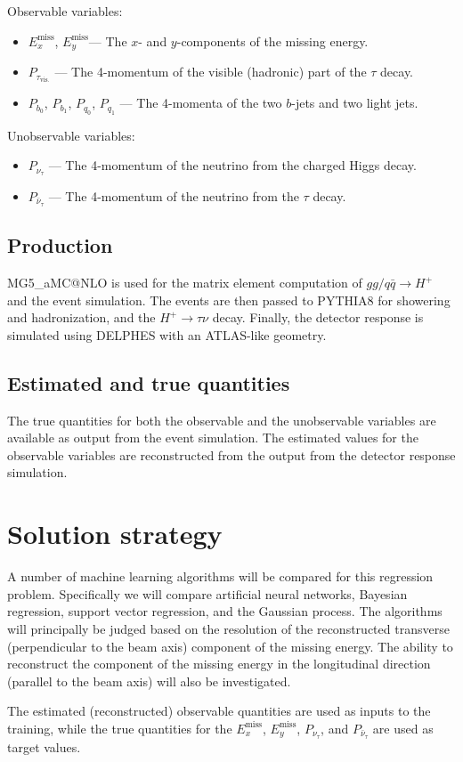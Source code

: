 \documentclass{scrartcl}
\newcommand{\exmiss}{$E_x^\text{miss}$}
\newcommand{\eymiss}{$E_y^\text{miss}$}
\begin{document}
Observable variables:
\begin{itemize}
    \item \exmiss, \eymiss --- The $x$- and $y$-components of the missing energy.
    \item $P_{\tau_\mathrm{vis.}}$ --- The 4-momentum of the visible (hadronic) part of the $\tau$ decay.
    \item $P_{b_0}$, $P_{b_1}$, $P_{q_0}$, $P_{q_1}$ --- The 4-momenta of the two $b$-jets and two light jets.
\end{itemize}

Unobservable variables:
\begin{itemize}
    \item $P_{\nu_\tau}$ --- The 4-momentum of the neutrino from the charged Higgs decay.
    \item $P_{\bar\nu_\tau}$ --- The 4-momentum of the neutrino from the $\tau$ decay.
\end{itemize}

\subsection{Production}
MG5\_aMC@NLO \cite{Alwall:2014hca} is used for the matrix element computation of $gg / q \bar q \to H^+$ and the event simulation. The events are then passed to PYTHIA8 \cite{Sjöstrand2015159} for showering and hadronization, and the $H^+\to \tau\nu$ decay. Finally, the detector response is simulated using DELPHES \cite{Favereau2014} with an ATLAS-like geometry.

\subsection{Estimated and true quantities}
The true quantities for both the observable and the unobservable variables are available as output from the event simulation. The estimated values for the observable variables are reconstructed from the output from the detector response simulation.

\section{Solution strategy}
A number of machine learning algorithms will be compared for this regression problem. Specifically we will compare artificial neural networks, Bayesian regression, support vector regression, and the Gaussian process. The algorithms will principally be judged based on the resolution of the reconstructed transverse (perpendicular to the beam axis) component of the missing energy. The ability to reconstruct the component of the missing energy in the longitudinal direction (parallel to the beam axis) will also be investigated.

The estimated (reconstructed) observable quantities are used as inputs to the training, while the true quantities for the \exmiss, \eymiss, $P_{\nu_\tau}$, and $P_{\bar\nu_\tau}$ are used as target values.


\end{document}
